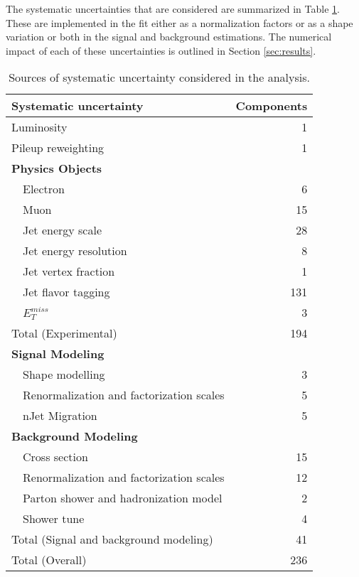
The systematic uncertainties that are considered are summarized in Table \ref{tab:SystSummary}. These are implemented in the fit either as a normalization factors or as a shape variation or both in the signal and background estimations. The numerical impact of each of these uncertainties is outlined in Section \ref{sec:results}.

\begin{table}[H]
\centering
\caption{Sources of systematic uncertainty considered in the analysis.}
\begin{tabular}{lr}
\hline\hline
Systematic uncertainty & Components  	      \\
\hline
\hline
Luminosity	& 1		      \\
Pileup reweighting 	& 1		      \\
\textbf {Physics Objects}     	&		      \\
\ \ Electron                               	& 6		      \\
\ \ Muon	& 15		      \\
\ \ Jet energy scale   	& 28                  \\
\ \ Jet energy resolution & 8 \\
\ \ Jet vertex fraction  	& 1		      \\
\ \ Jet flavor tagging   	& 131		      \\
\ \ $E^{miss}_T$  	& 3		      \\
\hline
Total (Experimental)        & 194		     \\
\hline
\hline
\textbf {Signal Modeling}           &                     \\
\ \ Shape modelling & 3 \\
\ \ Renormalization and factorization scales    & 5                  \\
\ \ nJet Migration & 5 \\
\textbf {Background Modeling}          	&		      \\
\ \ Cross section                 	& 15		      \\
\ \ Renormalization and factorization scales 	& 12		      \\
\ \ Parton shower and hadronization model       	& 2		      \\
\ \ Shower tune				& 4		      \\
\hline
Total (Signal and background modeling)       &  41		     \\
\hline\hline
Total (Overall)                             & 236	      \\
\hline\hline
\end{tabular}
\label{tab:SystSummary}
\end{table}

